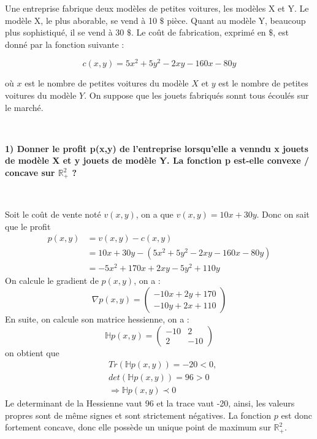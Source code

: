\documentclass[12pt]{report}
\begin{document}
\fancyhead[RO]{\leftmark}
\fancyhead[LE]{\textsc{\chaptername~\thechapter}}

\begin{flushleft}
Une entreprise fabrique deux modèles de petites voitures, les modèles X et Y. Le modèle X, le plus aborable, se vend à 10 $\$$ pièce.  Quant au modèle Y, beaucoup plus sophistiqué, il se vend à 30 $\$$. Le coût de fabrication, exprimé en $\$$, est donné par la fonction suivante : 

$$c(x,y) = 5x^2 + 5y^2 - 2xy - 160x - 80y$$

où $x$ est le nombre de petites voitures du modèle $X$ et $y$ est le nombre de petites voitures du modèle $Y$. On suppose que les jouets fabriqués sonnt tous écoulés sur le marché.\end{flushleft} \\

\begin{flushleft}
\textbf{
1) Donner le profit p(x,y) de l'entreprise lorsqu'elle a venndu x jouets de modèle X et y jouets de modèle Y. La fonction p est-elle convexe / concave sur $\mathbb{R}^2_{+}$ ?}\end{flushleft}\\
\begin{flushleft}
Soit le coût de vente noté $v(x,y)$, on a que $v(x,y) = 10x + 30y$.
Donc on sait que le profit
\begin{align*}
    p(x,y) &= v(x,y) - c(x,y) \\
    &= 10x + 30y - (5x^2 + 5y^2 - 2xy - 160x - 80y)\\
    &= -5x^2 + 170x + 2xy - 5y^2 + 110y
\end{align*}
On calcule le gradient de $p(x,y)$, on a :
$$\nabla p(x,y) = \begin{pmatrix} -10x + 2y + 170 \\ -10y + 2x + 110 \end{pmatrix}$$
En suite, on calcule son matrice hessienne, on a :
$$\mathbb{H}p(x,y) = \begin{pmatrix} -10 & 2 \\ 2 & -10 \end{pmatrix} $$
on obtient que
\begin{align*}
    &Tr(\mathbb{H}p(x,y)) = -20 < 0, \\
    &det(\mathbb{H}p(x,y)) = 96 > 0 \\
    &\Rightarrow \mathbb{H}p(x,y) \prec 0
\end{align*}
Le determinant de la Hessienne vaut 96 et la trace vaut -20, ainsi, les valeurs propres sont de même signes et sont strictement négatives. La fonction $p$ est donc fortement concave, donc elle possède un unique point de maximum sur $\mathbb{R}^2_{+}$.\end{flushleft}\\ 
\end{document}
